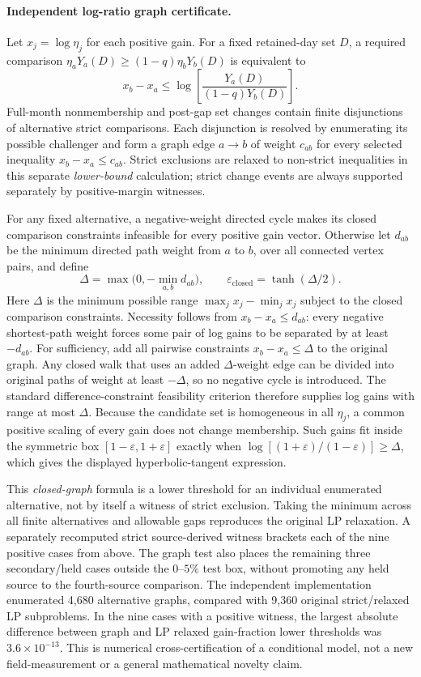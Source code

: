 \documentclass[11pt]{article}
\begin{document}
\paragraph{Independent log-ratio graph certificate.}
Let $x_j=\log\eta_j$ for each positive gain. For a fixed retained-day set $D$, a required comparison
$\eta_aY_a(D)\ge(1-q)\eta_bY_b(D)$ is equivalent to
\[
  x_b-x_a\le
  \log\left[\frac{Y_a(D)}{(1-q)Y_b(D)}\right].
\]
Full-month nonmembership and post-gap set changes contain finite disjunctions of alternative strict comparisons. Each disjunction is resolved by enumerating its possible challenger and form a graph edge $a\to b$ of weight $c_{ab}$ for every selected inequality $x_b-x_a\le c_{ab}$. Strict exclusions are relaxed to non-strict inequalities in this separate \emph{lower-bound} calculation; strict change events are always supported separately by positive-margin witnesses.

For any fixed alternative, a negative-weight directed cycle makes its closed comparison constraints infeasible for every positive gain vector. Otherwise let $d_{ab}$ be the minimum directed path weight from $a$ to $b$, over all connected vertex pairs, and define
\[
  \Delta=\max\bigl(0,-\min_{a,b}d_{ab}\bigr),
  \qquad
  \varepsilon_{\mathrm{closed}}=\tanh(\Delta/2).
\]
Here $\Delta$ is the minimum possible range $\max_jx_j-\min_jx_j$ subject to the closed comparison constraints. Necessity follows from $x_b-x_a\le d_{ab}$: every negative shortest-path weight forces some pair of log gains to be separated by at least $-d_{ab}$. For sufficiency, add all pairwise constraints $x_b-x_a\le\Delta$ to the original graph. Any closed walk that uses an added $\Delta$-weight edge can be divided into original paths of weight at least $-\Delta$, so no negative cycle is introduced. The standard difference-constraint feasibility criterion therefore supplies log gains with range at most $\Delta$. Because the candidate set is homogeneous in all $\eta_j$, a common positive scaling of every gain does not change membership. Such gains fit inside the symmetric box $[1-\varepsilon,1+\varepsilon]$ exactly when $\log[(1+\varepsilon)/(1-\varepsilon)]\ge\Delta$, which gives the displayed hyperbolic-tangent expression.

This \emph{closed-graph} formula is a lower threshold for an individual enumerated alternative, not by itself a witness of strict exclusion. Taking the minimum across all finite alternatives and allowable gaps reproduces the original LP relaxation. A separately recomputed strict source-derived witness brackets each of the nine positive cases from above. The graph test also places the remaining three secondary/held cases outside the $0$--$5\%$ test box, without promoting any held source to the fourth-source comparison. The independent implementation enumerated 4,680 alternative graphs, compared with 9,360 original strict/relaxed LP subproblems. In the nine cases with a positive witness, the largest absolute difference between graph and LP relaxed gain-fraction lower thresholds was $3.6\times10^{-13}$. This is numerical cross-certification of a conditional model, not a new field-measurement or a general mathematical novelty claim.
\end{document}
